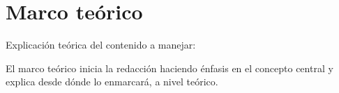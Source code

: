 \section{Marco teórico}
Explicación teórica del contenido a manejar:

El marco teórico inicia la redacción haciendo énfasis en el concepto central y explica desde dónde lo enmarcará, a nivel teórico.